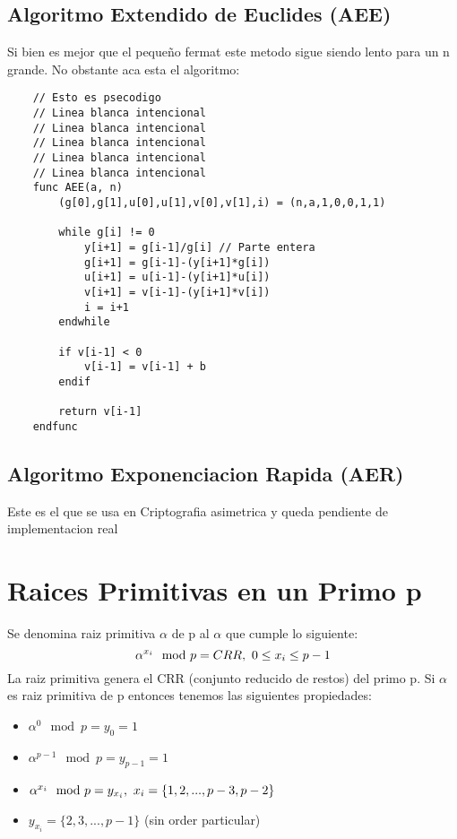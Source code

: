 \documentclass{article}
\begin{document}
\subsection{Algoritmo Extendido de Euclides (AEE)}
Si bien es mejor que el pequeño fermat este metodo sigue siendo lento para un n grande. No
obstante aca esta el algoritmo:

\begin{verbatim}
    // Esto es psecodigo
    // Linea blanca intencional
    // Linea blanca intencional
    // Linea blanca intencional
    // Linea blanca intencional
    // Linea blanca intencional
    func AEE(a, n)
        (g[0],g[1],u[0],u[1],v[0],v[1],i) = (n,a,1,0,0,1,1)

        while g[i] != 0
            y[i+1] = g[i-1]/g[i] // Parte entera
            g[i+1] = g[i-1]-(y[i+1]*g[i])
            u[i+1] = u[i-1]-(y[i+1]*u[i])
            v[i+1] = v[i-1]-(y[i+1]*v[i])
            i = i+1
        endwhile

        if v[i-1] < 0
            v[i-1] = v[i-1] + b
        endif

        return v[i-1]
    endfunc
\end{verbatim}

\subsection{Algoritmo Exponenciacion Rapida (AER)}
Este es el que se usa en Criptografia asimetrica y queda pendiente de implementacion real

\section{Raices Primitivas en un Primo p}
Se denomina raiz primitiva $\alpha$ de p al $\alpha$ que cumple lo siguiente:
$$
    \alpha^{x_{i}} \mod p = CRR, \,\, 0 \leq x_{i} \leq p-1
$$
La raiz primitiva genera el CRR (conjunto reducido de restos) del primo p. Si $\alpha$ es
raiz primitiva de p entonces tenemos las siguientes propiedades:
\begin{itemize}
    \item $\alpha^{0} \mod p = y_{0} = 1$
    \item $\alpha^{p-1} \mod p = y_{p-1} = 1$
    \item $\alpha^{x_{i}} \mod p = y_{x_{i}}, \,\, x_{i} = \{1,2,...,p-3,p-2\}$
    \item $y_{x_{i}} = \{2,3,...,p-1\}$ (sin order particular)
\end{itemize}
\end{document}
